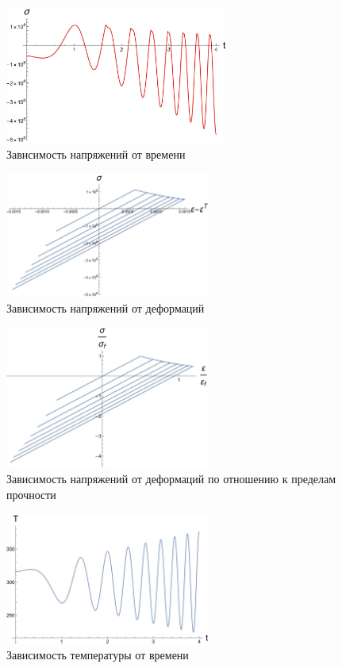 \documentclass[12pt, a4paper]{article}
\begin{document}
\begin{enumerate}
	  \begin{figure}[H]
	  	\centering
	  	\includegraphics[width=0.65\textwidth]{T2_3}
	  	\caption{Зависимость напряжений от времени}
	  	\label{fig:6}
	  \end{figure}
	  
	  \begin{figure}[H]
	  	\centering
	  	\includegraphics[width=0.6\textwidth]{T2_4}
	  	\caption{Зависимость напряжений от деформаций}
	  	\label{fig:p7}
	  \end{figure}
	  
	  \begin{figure}[H]
	  	\centering
	  	\includegraphics[width=0.6\textwidth]{T2_5}
	  	\caption{Зависимость напряжений от деформаций по отношению к пределам прочности}
	  		\label{fig:p8}
	  \end{figure}
	  
	  \begin{figure}[H]
	  	\centering
	  	\includegraphics[width=0.6\textwidth]{T2_6}
	  	\caption{Зависимость температуры от времени}
	  		\label{fig:p9}
	  \end{figure}
  

\end{enumerate}
\end{document}
